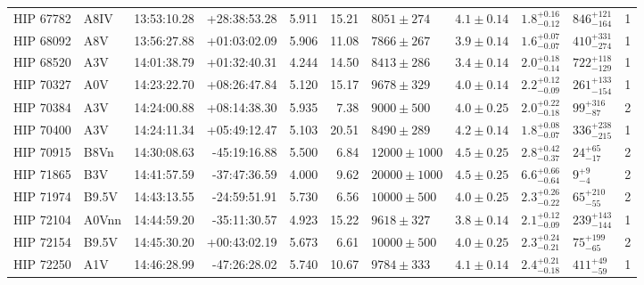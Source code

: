 \begin{landscape}
\begin{scriptsize}
\begin{longtable}{|l|lrrrrlllll|}
   HIP 67782 &     A8IV &    13:53:10.28 &   +28:38:53.28 &   5.911 &     15.21 &    $8051 \pm 274$ &  $4.1 \pm 0.14$ &  $1.8^{+0.16}_{-0.12}$ &   $846^{+121}_{-164}$ &       1 \\
   HIP 68092 &      A8V &    13:56:27.88 &   +01:03:02.09 &   5.906 &     11.08 &    $7866 \pm 267$ &  $3.9 \pm 0.14$ &  $1.6^{+0.07}_{-0.07}$ &   $410^{+331}_{-274}$ &       1 \\
   HIP 68520 &      A3V &    14:01:38.79 &   +01:32:40.31 &   4.244 &     14.50 &    $8413 \pm 286$ &  $3.4 \pm 0.14$ &  $2.0^{+0.18}_{-0.14}$ &   $722^{+118}_{-129}$ &       1 \\
   HIP 70327 &      A0V &    14:23:22.70 &   +08:26:47.84 &   5.120 &     15.17 &    $9678 \pm 329$ &  $4.0 \pm 0.14$ &  $2.2^{+0.12}_{-0.09}$ &   $261^{+133}_{-154}$ &       1 \\
   HIP 70384 &      A3V &    14:24:00.88 &   +08:14:38.30 &   5.935 &      7.38 &    $9000 \pm 500$ &  $4.0 \pm 0.25$ &  $2.0^{+0.22}_{-0.18}$ &     $99^{+316}_{-87}$ &       2 \\
   HIP 70400 &      A3V &    14:24:11.34 &   +05:49:12.47 &   5.103 &     20.51 &    $8490 \pm 289$ &  $4.2 \pm 0.14$ &  $1.8^{+0.08}_{-0.07}$ &   $336^{+238}_{-215}$ &       1 \\
   HIP 70915 &     B8Vn &    14:30:08.63 &   -45:19:16.88 &   5.500 &      6.84 &  $12000 \pm 1000$ &  $4.5 \pm 0.25$ &  $2.8^{+0.42}_{-0.37}$ &      $24^{+65}_{-17}$ &       2 \\
   HIP 71865 &      B3V &    14:41:57.59 &   -37:47:36.59 &   4.000 &      9.62 &  $20000 \pm 1000$ &  $4.5 \pm 0.25$ &  $6.6^{+0.66}_{-0.64}$ &         $9^{+9}_{-4}$ &       2 \\
   HIP 71974 &    B9.5V &    14:43:13.55 &   -24:59:51.91 &   5.730 &      6.56 &   $10000 \pm 500$ &  $4.0 \pm 0.25$ &  $2.3^{+0.26}_{-0.22}$ &     $65^{+210}_{-55}$ &       2 \\
   HIP 72104 &    A0Vnn &    14:44:59.20 &   -35:11:30.57 &   4.923 &     15.22 &    $9618 \pm 327$ &  $3.8 \pm 0.14$ &  $2.1^{+0.12}_{-0.09}$ &   $239^{+143}_{-144}$ &       1 \\
   HIP 72154 &    B9.5V &    14:45:30.20 &   +00:43:02.19 &   5.673 &      6.61 &   $10000 \pm 500$ &  $4.0 \pm 0.25$ &  $2.3^{+0.24}_{-0.21}$ &     $75^{+199}_{-65}$ &       2 \\
   HIP 72250 &      A1V &    14:46:28.99 &   -47:26:28.02 &   5.740 &     10.67 &    $9784 \pm 333$ &  $4.1 \pm 0.14$ &  $2.4^{+0.21}_{-0.18}$ &     $411^{+49}_{-59}$ &       1 \\

\end{longtable}
\end{scriptsize}
\end{landscape}
